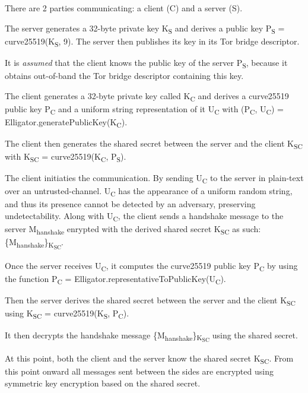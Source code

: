 \documentclass[11pt]{article} %
\begin{document}
There are 2 parties communicating: a client (C) and a server (S).

The server generates a 32-byte private key K\textsubscript{S} and derives a public key P\textsubscript{S} = curve25519(K\textsubscript{S}, 9). The server then publishes its key in its Tor bridge descriptor.

 It is \textit{assumed} that the client knows the public key of the server P\textsubscript{S}, because it obtains out-of-band the Tor bridge descriptor containing this key.

The client generates a 32-byte private key called K\textsubscript{C} and derives a curve25519 public key P\textsubscript{C} and a uniform string representation of it U\textsubscript{C} with (P\textsubscript{C}, U\textsubscript{C}) = Elligator.generatePublicKey(K\textsubscript{C}).

The client then generates the shared secret between the server and the client K\textsubscript{SC} with K\textsubscript{SC} = curve25519(K\textsubscript{C},  P\textsubscript{S}).

The client initiaties the communication. By sending U\textsubscript{C} to the server in plain-text over an untrusted-channel. U\textsubscript{C} has the appearance of a uniform random string, and thus its presence cannot be detected by an adversary, preserving undetectability. Along with U\textsubscript{C}, the client sends a handshake message to the server M\textsubscript{hanshake} enrypted with the derived shared secret K\textsubscript{SC} as such: \{M\textsubscript{hanshake}\}\textsubscript{K\textsubscript{SC}}.

Once the server receives U\textsubscript{C}, it computes the curve25519 public key P\textsubscript{C} by using the function P\textsubscript{C} = Elligator.representativeToPublicKey(U\textsubscript{C}).

Then the server derives the shared secret between the server and the client K\textsubscript{SC} using K\textsubscript{SC} = curve25519(K\textsubscript{S}, P\textsubscript{C}).

It then decrypts the handshake message \{M\textsubscript{hanshake}\}\textsubscript{K\textsubscript{SC}} using the shared secret.

At this point, both the client and the server know the shared secret K\textsubscript{SC}. From this point onward all messages sent between the sides are encrypted using symmetric key encryption based on the shared secret.

\end{document}
